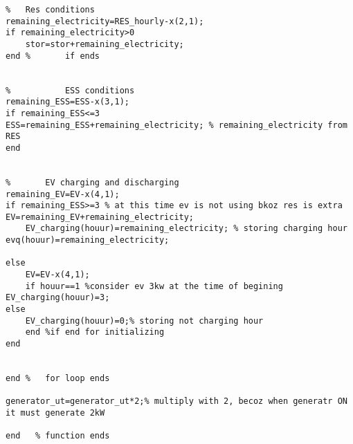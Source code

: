 \begin{linenumbers}
\begin{lstlisting}
%   Res conditions
remaining_electricity=RES_hourly-x(2,1);
if remaining_electricity>0
    stor=stor+remaining_electricity;
end %       if ends


%           ESS conditions
remaining_ESS=ESS-x(3,1);
if remaining_ESS<=3
ESS=remaining_ESS+remaining_electricity; % remaining_electricity from RES
end


%       EV charging and discharging
remaining_EV=EV-x(4,1);
if remaining_ESS>=3 % at this time ev is not using bkoz res is extra
EV=remaining_EV+remaining_electricity;
    EV_charging(houur)=remaining_electricity; % storing charging hour
evq(houur)=remaining_electricity;

else
    EV=EV-x(4,1);
    if houur==1 %consider ev 3kw at the time of begining
EV_charging(houur)=3;
else
    EV_charging(houur)=0;% storing not charging hour
    end %if end for initializing
end


end %   for loop ends

generator_ut=generator_ut*2;% multiply with 2, becoz when generatr ON it must generate 2kW

end   % function ends
\end{lstlisting}
\end{linenumbers} 